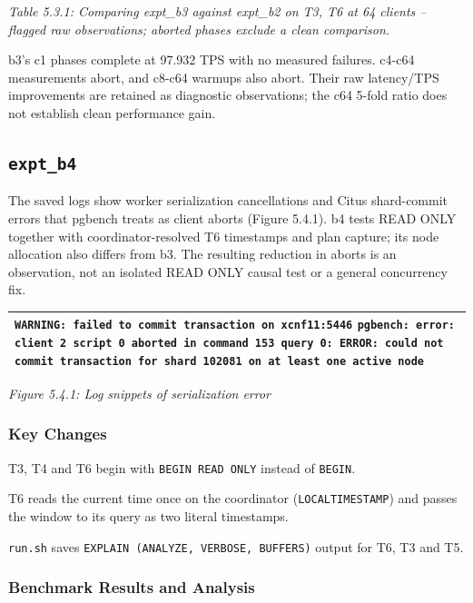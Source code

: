 {\itshape Table 5.3.1: Comparing expt\_b3 against expt\_b2 on T3, T6 at 64 clients  --  flagged raw observations; aborted phases exclude a clean comparison.}\par
b3's c1 phases complete at 97.932 TPS with no measured failures. c4-c64 measurements abort, and c8-c64 warmups also abort. Their raw latency/TPS improvements are retained as diagnostic observations; the c64 5-fold ratio does not establish clean performance gain.\par
{}\subsection{\texttt{expt\_\allowbreak{}b4}}
The saved logs show worker serialization cancellations and Citus shard-commit errors that pgbench treats as client aborts (Figure 5.4.1). b4 tests READ ONLY together with coordinator-resolved T6 timestamps and plan capture; its node allocation also differs from b3. The resulting reduction in aborts is an observation, not an isolated READ ONLY causal test or a general concurrency fix.\par
{}
{\fontsize{10.5}{12.5}\selectfont\setlength{\tabcolsep}{2mm}\renewcommand{\arraystretch}{1.15}
\begin{longtable}{>{\raggedright\arraybackslash}p{166.0mm}}\toprule
\texttt{WARNING:  failed to commit transaction on xcnf11:5446} \texttt{pgbench: error: client 2 script 0 aborted in command 153 query 0: ERROR:  could not commit transaction for shard 102081 on at least one active node} \\
\midrule\endhead
\bottomrule\end{longtable}}
{\itshape Figure 5.4.1: Log snippets of serialization error}\par
{}\subsubsection*{Key Changes}
T3, T4 and T6 begin with \texttt{BEGIN READ ONLY} instead of \texttt{BEGIN}.\par
T6 reads the current time once on the coordinator (\texttt{LOCALTIMESTAMP}) and passes the window to its query as two literal timestamps.\par
\texttt{run.sh} saves \texttt{EXPLAIN (ANALYZE, VERBOSE, BUFFERS)} output for T6, T3 and T5.\par
{}\subsubsection*{Benchmark Results and Analysis}

